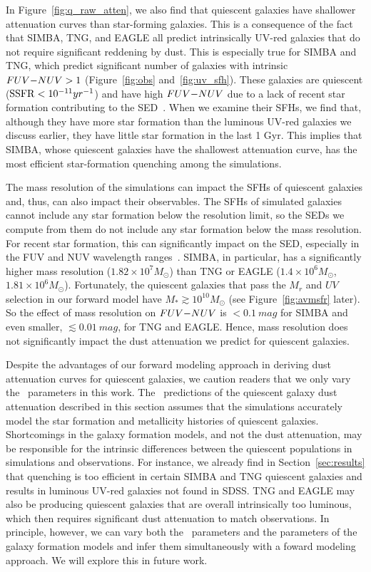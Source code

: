 In Figure~\ref{fig:q_raw_atten}, we also find that quiescent galaxies have
shallower attenuation curves than star-forming galaxies. 
This is a consequence of the fact that SIMBA, TNG, and EAGLE all predict
intrinsically UV-red galaxies that do not require significant reddening by
dust. 
This is especially true for SIMBA and TNG, which predict significant
number of galaxies with intrinsic $FUV{-}NUV > 1$ (Figure~\ref{fig:obs}
and~\ref{fig:uv_sfh}).
These galaxies are quiescent (${\rm SSFR} < 10^{-11}yr^{-1}$) and have high
$FUV{-}NUV$ due to a lack of recent star formation contributing to the
SED~\citep{leja2017}. 
When we examine their SFHs, we find that, although they have more star
formation than the luminous UV-red galaxies we discuss earlier, they have
little star formation in the last 1 Gyr. 
This implies that SIMBA, whose quiescent galaxies have the shallowest
attenuation curve, has the most efficient star-formation quenching among
the simulations. 

The mass resolution of the simulations can impact the SFHs of quiescent
galaxies and, thus, can also impact their observables.
The SFHs of simulated galaxies cannot include any star formation below the
resolution limit, so the SEDs we compute from them do not include any star
formation below the mass resolution. 
For recent star formation, this can significantly impact on the SED,
especially in the FUV and NUV wavelength ranges~\citep{leja2017}. 
SIMBA, in particular, has a significantly higher mass resolution
($1.82\times10^7M_\odot$) than TNG or EAGLE ($1.4\times10^{6}M_\odot$,
$1.81\times10^6M_\odot$).
Fortunately, the quiescent galaxies that pass the $M_r$ and $UV$ selection
in our forward model have $M_* \gtrsim 10^{10}M_\odot$ (see
Figure~\ref{fig:avmsfr} later). 
So the effect of mass resolution on $FUV{-}NUV$ is $<0.1~mag$ for SIMBA and
even smaller, $\lesssim 0.01~mag$, for TNG and EAGLE. 
Hence, mass resolution does not significantly impact the dust attenuation
we predict for quiescent galaxies.  


Despite the advantages of our forward modeling approach in deriving dust
attenuation curves for quiescent galaxies, we caution readers
that we only vary the \eda~parameters in this work.     
The \eda~predictions of the quiescent galaxy dust attenuation described in this
section assumes that the simulations accurately model the star formation and
metallicity histories of quiescent galaxies. 
Shortcomings in the galaxy formation models, and not the dust attenuation, may
be responsible for the intrinsic differences between the quiescent populations
in simulations and observations. 
For instance, we already find in Section~\ref{sec:results} that quenching
is too efficient in certain SIMBA and TNG quiescent galaxies and results
in luminous UV-red galaxies not found in SDSS. %
TNG and EAGLE may also be producing quiescent galaxies that are
overall intrinsically too luminous, which then requires significant dust
attenuation to match observations.
In principle, however, we can vary both the \eda~parameters and the parameters
of the galaxy formation models and infer them simultaneously with a foward
modeling approach. 
We will explore this in future work. 
